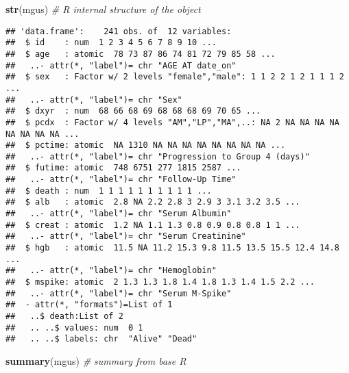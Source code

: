 \documentclass[]{book}
\newenvironment{Shaded}{\begin{snugshade}}{\end{snugshade}}
\newcommand{\KeywordTok}[1]{\textcolor[rgb]{0.13,0.29,0.53}{\textbf{{#1}}}}
\newcommand{\CommentTok}[1]{\textcolor[rgb]{0.56,0.35,0.01}{\textit{{#1}}}}
\newcommand{\NormalTok}[1]{{#1}}
\theoremstyle{definition}
\theoremstyle{definition}
\theoremstyle{definition}
\theoremstyle{remark}
\begin{document}
\begin{Shaded}
\begin{Highlighting}[]
\KeywordTok{str}\NormalTok{(mgus)                                   }\CommentTok{# R internal structure of the object}
\end{Highlighting}
\end{Shaded}

\begin{verbatim}
## 'data.frame':    241 obs. of  12 variables:
##  $ id    : num  1 2 3 4 5 6 7 8 9 10 ...
##  $ age   : atomic  78 73 87 86 74 81 72 79 85 58 ...
##   ..- attr(*, "label")= chr "AGE AT date_on"
##  $ sex   : Factor w/ 2 levels "female","male": 1 1 2 2 1 2 1 1 1 2 ...
##   ..- attr(*, "label")= chr "Sex"
##  $ dxyr  : num  68 66 68 69 68 68 68 69 70 65 ...
##  $ pcdx  : Factor w/ 4 levels "AM","LP","MA",..: NA 2 NA NA NA NA NA NA NA NA ...
##  $ pctime: atomic  NA 1310 NA NA NA NA NA NA NA NA ...
##   ..- attr(*, "label")= chr "Progression to Group 4 (days)"
##  $ futime: atomic  748 6751 277 1815 2587 ...
##   ..- attr(*, "label")= chr "Follow-Up Time"
##  $ death : num  1 1 1 1 1 1 1 1 1 1 ...
##  $ alb   : atomic  2.8 NA 2.2 2.8 3 2.9 3 3.1 3.2 3.5 ...
##   ..- attr(*, "label")= chr "Serum Albumin"
##  $ creat : atomic  1.2 NA 1.1 1.3 0.8 0.9 0.8 0.8 1 1 ...
##   ..- attr(*, "label")= chr "Serum Creatinine"
##  $ hgb   : atomic  11.5 NA 11.2 15.3 9.8 11.5 13.5 15.5 12.4 14.8 ...
##   ..- attr(*, "label")= chr "Hemoglobin"
##  $ mspike: atomic  2 1.3 1.3 1.8 1.4 1.8 1.3 1.4 1.5 2.2 ...
##   ..- attr(*, "label")= chr "Serum M-Spike"
##  - attr(*, "formats")=List of 1
##   ..$ death:List of 2
##   .. ..$ values: num  0 1
##   .. ..$ labels: chr  "Alive" "Dead"
\end{verbatim}

\begin{Shaded}
\begin{Highlighting}[]
\KeywordTok{summary}\NormalTok{(mgus)                                              }\CommentTok{# summary from base R}
\end{Highlighting}
\end{Shaded}
\end{document}
